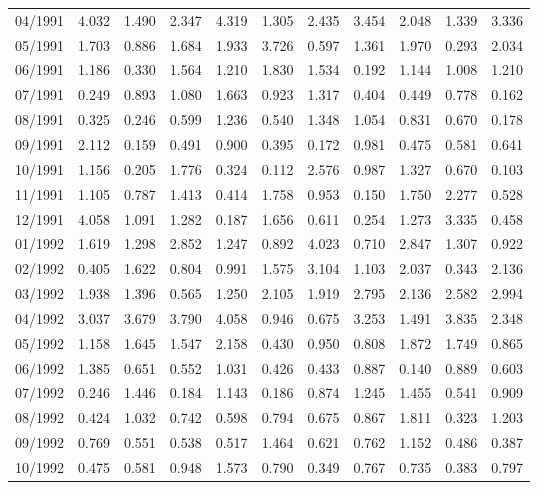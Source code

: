 \begin{tabular}{lrrrrrrrrrr}
04/1991 &  4.032 &  1.490 &  2.347 &  4.319 &  1.305 &  2.435 &  3.454 &  2.048 &  1.339 &  3.336 \\
05/1991 &  1.703 &  0.886 &  1.684 &  1.933 &  3.726 &  0.597 &  1.361 &  1.970 &  0.293 &  2.034 \\
06/1991 &  1.186 &  0.330 &  1.564 &  1.210 &  1.830 &  1.534 &  0.192 &  1.144 &  1.008 &  1.210 \\
07/1991 &  0.249 &  0.893 &  1.080 &  1.663 &  0.923 &  1.317 &  0.404 &  0.449 &  0.778 &  0.162 \\
08/1991 &  0.325 &  0.246 &  0.599 &  1.236 &  0.540 &  1.348 &  1.054 &  0.831 &  0.670 &  0.178 \\
09/1991 &  2.112 &  0.159 &  0.491 &  0.900 &  0.395 &  0.172 &  0.981 &  0.475 &  0.581 &  0.641 \\
10/1991 &  1.156 &  0.205 &  1.776 &  0.324 &  0.112 &  2.576 &  0.987 &  1.327 &  0.670 &  0.103 \\
11/1991 &  1.105 &  0.787 &  1.413 &  0.414 &  1.758 &  0.953 &  0.150 &  1.750 &  2.277 &  0.528 \\
12/1991 &  4.058 &  1.091 &  1.282 &  0.187 &  1.656 &  0.611 &  0.254 &  1.273 &  3.335 &  0.458 \\
01/1992 &  1.619 &  1.298 &  2.852 &  1.247 &  0.892 &  4.023 &  0.710 &  2.847 &  1.307 &  0.922 \\
02/1992 &  0.405 &  1.622 &  0.804 &  0.991 &  1.575 &  3.104 &  1.103 &  2.037 &  0.343 &  2.136 \\
03/1992 &  1.938 &  1.396 &  0.565 &  1.250 &  2.105 &  1.919 &  2.795 &  2.136 &  2.582 &  2.994 \\
04/1992 &  3.037 &  3.679 &  3.790 &  4.058 &  0.946 &  0.675 &  3.253 &  1.491 &  3.835 &  2.348 \\
05/1992 &  1.158 &  1.645 &  1.547 &  2.158 &  0.430 &  0.950 &  0.808 &  1.872 &  1.749 &  0.865 \\
06/1992 &  1.385 &  0.651 &  0.552 &  1.031 &  0.426 &  0.433 &  0.887 &  0.140 &  0.889 &  0.603 \\
07/1992 &  0.246 &  1.446 &  0.184 &  1.143 &  0.186 &  0.874 &  1.245 &  1.455 &  0.541 &  0.909 \\
08/1992 &  0.424 &  1.032 &  0.742 &  0.598 &  0.794 &  0.675 &  0.867 &  1.811 &  0.323 &  1.203 \\
09/1992 &  0.769 &  0.551 &  0.538 &  0.517 &  1.464 &  0.621 &  0.762 &  1.152 &  0.486 &  0.387 \\
10/1992 &  0.475 &  0.581 &  0.948 &  1.573 &  0.790 &  0.349 &  0.767 &  0.735 &  0.383 &  0.797 \\

\end{tabular}
